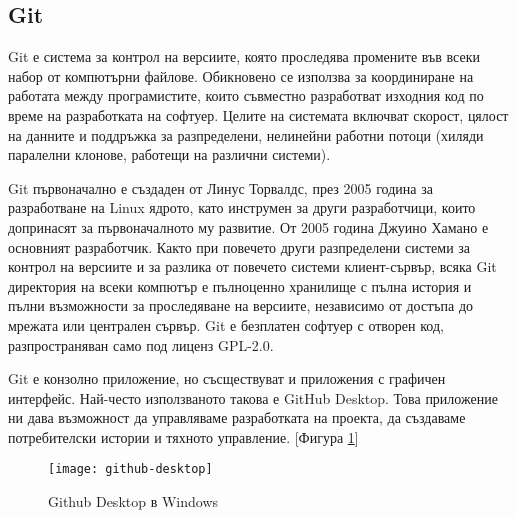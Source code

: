 \subsection{Git}
Git е система за контрол на версиите, която проследява промените във всеки
набор от компютърни файлове. Обикновено се използва за координиране на работата
между програмистите, които съвместно разработват изходния код по време на
разработката на софтуер. Целите на системата включват скорост, цялост на
данните и поддръжка за разпределени, нелинейни работни потоци (хиляди паралелни
клонове, работещи на различни системи).

Git първоначално е създаден от Линус Торвалдс, през 2005 година за разработване
на Linux ядрото, като инструмен за други разработчици, които допринасят за
първоначалното му развитие. От 2005 година Джуино Хамано е основният
разработчик. Както при повечето други разпределени системи за контрол на
версиите и за разлика от повечето системи клиент-сървър, всяка Git директория
на всеки компютър е пълноценно хранилище с пълна история и пълни възможности за
проследяване на версиите, независимо от достъпа до мрежата или централен
сървър. Git е безплатен софтуер с отворен код, разпространяван само под лиценз
GPL-2.0. \cite{git_wikipedia}

Git е конзолно приложение, но съсществуват и приложения с графичен интерфейс.
Най-често използваното такова е GitHub Desktop. Това приложение ни дава
възможност да управляваме разработката на проекта, да създаваме потребителски
истории и тяхното управление. [Фигура \ref{fig:github-desktop}]
\cite{github_desktop}

\begin{figure}[!htb]
  \texttt{[image: github-desktop]}
  \centering
  \caption{Github Desktop в Windows}
  \label{fig:github-desktop}
\end{figure}

